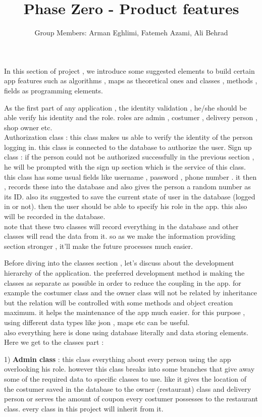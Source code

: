 \documentclass[12pt]{article}
\title{Phase Zero - Product features}
\author{Group Members: Arman Eghlimi, Fatemeh Azami, Ali Behrad}
\begin{document}
\maketitle

In this section of project , we introduce some suggested elements to build certain app features such as algorithms , maps as theoretical ones and classes , methods , fields 
as programming elements.

As the first part of any application , the identity validation , he/she should be able verify his identity and the role. roles are admin , costumer , delivery person , shop owner etc. \\
Authorization class : this class makes us able to verify the identity of the person logging in. this class is connected to the database to authorize the user.
Sign up class : if the person could not be authorized successfully in the previous section , he will be prompted with the sign up section which is the service of this class.
this class has some usual fields like username , password , phone number . it then , records these into the database and also gives the person a random number as its ID.
also its suggested to save the current state of user in the database (logged in or not). then the user should be able to specify his role in the app. this also will be recorded in the database. \\
note that these two classes will record everything in the database and other classes will read the data from it. so as we make the information providing section stronger , it'll make the future processes much easier.

Before diving into the classes section , let's discuss about the development hierarchy of the application. the preferred development method is making the classes as separate as possible in order to reduce the coupling in the app. for example the costumer class and the owner class will not 
be related by inheritance but the relation will be controlled with some methods and object creation maximum. it helps the maintenance of the app much easier. for this purpose , using different data types like json , maps etc can be useful. \\
also everything here is done using database literally and data storing elements. \\
Here we get to the classes part : 

1) \textbf{Admin class} : this class everything about every person using the app overlooking his role. however this class breaks into some branches that give away some of the required data to specific classes to use.
like it gives the location of the costumer saved in the database to the owner (restaurant) class and delivery person or serves the amount of coupon every costumer possesses to the restaurant class. 
every class in this project will inherit from it.
\end{document}
